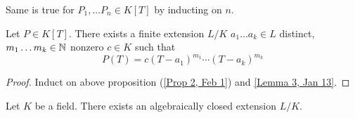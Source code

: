 \begin{rmk}
    Same is true for $P_1, \dots P_n \in K[T]$ by inducting on $n$.
\end{rmk}

\begin{cor} \label{Cor 3, Feb 1}
    Let $P \in K[T]$. There exists a finite extension $L / K$ $a_1 \dots a_k \in L$
    distinct, $m_1 \dots m_k \in \mathbb{N}$ nonzero $c \in K$ such that
    $$
    P(T) = c(T - a_1)^{m_1} \cdots (T - a_k)^{m_k}
    $$
\end{cor}
\begin{proof}
    Induct on above proposition (\ref{Prop 2, Feb 1}) and \ref{Lemma 3, Jan 13}.
\end{proof}

\begin{thm} \label{Thm 4, Feb 1}
    Let $K$ be a field. There exists an algebraically closed extension $L / K$.
\end{thm}

